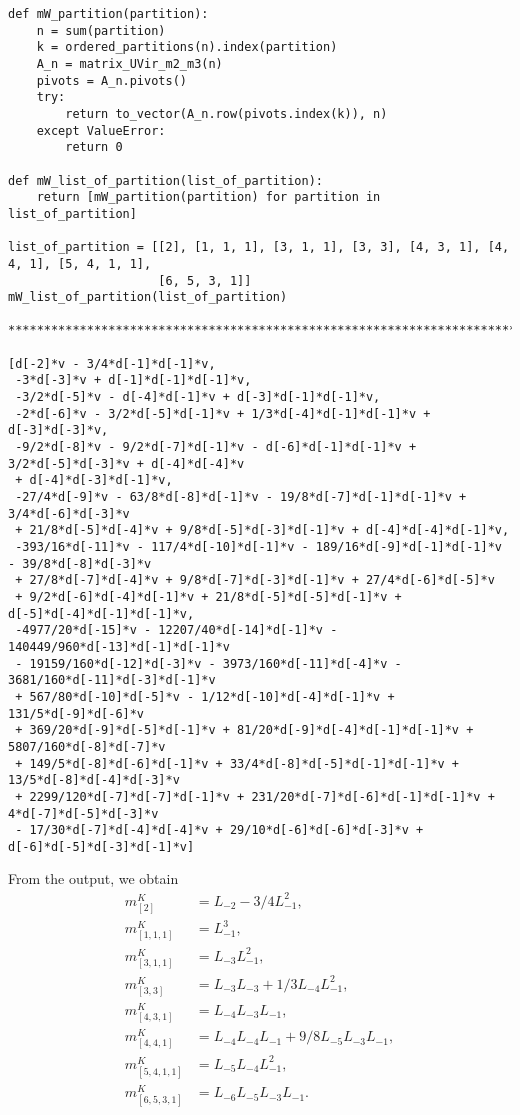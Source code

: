 \documentclass[12pt, a4paper]{article}
\begin{document}
\begin{footnotesize}
\begin{verbatim}
def mW_partition(partition):
    n = sum(partition)
    k = ordered_partitions(n).index(partition)
    A_n = matrix_UVir_m2_m3(n)
    pivots = A_n.pivots()
    try:
        return to_vector(A_n.row(pivots.index(k)), n)
    except ValueError:
        return 0

def mW_list_of_partition(list_of_partition):
    return [mW_partition(partition) for partition in list_of_partition]

list_of_partition = [[2], [1, 1, 1], [3, 1, 1], [3, 3], [4, 3, 1], [4, 4, 1], [5, 4, 1, 1],
                     [6, 5, 3, 1]]
mW_list_of_partition(list_of_partition)

*******************************************************************************************

[d[-2]*v - 3/4*d[-1]*d[-1]*v,
 -3*d[-3]*v + d[-1]*d[-1]*d[-1]*v,
 -3/2*d[-5]*v - d[-4]*d[-1]*v + d[-3]*d[-1]*d[-1]*v,
 -2*d[-6]*v - 3/2*d[-5]*d[-1]*v + 1/3*d[-4]*d[-1]*d[-1]*v + d[-3]*d[-3]*v,
 -9/2*d[-8]*v - 9/2*d[-7]*d[-1]*v - d[-6]*d[-1]*d[-1]*v + 3/2*d[-5]*d[-3]*v + d[-4]*d[-4]*v
 + d[-4]*d[-3]*d[-1]*v,
 -27/4*d[-9]*v - 63/8*d[-8]*d[-1]*v - 19/8*d[-7]*d[-1]*d[-1]*v + 3/4*d[-6]*d[-3]*v
 + 21/8*d[-5]*d[-4]*v + 9/8*d[-5]*d[-3]*d[-1]*v + d[-4]*d[-4]*d[-1]*v,
 -393/16*d[-11]*v - 117/4*d[-10]*d[-1]*v - 189/16*d[-9]*d[-1]*d[-1]*v - 39/8*d[-8]*d[-3]*v
 + 27/8*d[-7]*d[-4]*v + 9/8*d[-7]*d[-3]*d[-1]*v + 27/4*d[-6]*d[-5]*v
 + 9/2*d[-6]*d[-4]*d[-1]*v + 21/8*d[-5]*d[-5]*d[-1]*v + d[-5]*d[-4]*d[-1]*d[-1]*v,
 -4977/20*d[-15]*v - 12207/40*d[-14]*d[-1]*v - 140449/960*d[-13]*d[-1]*d[-1]*v
 - 19159/160*d[-12]*d[-3]*v - 3973/160*d[-11]*d[-4]*v - 3681/160*d[-11]*d[-3]*d[-1]*v
 + 567/80*d[-10]*d[-5]*v - 1/12*d[-10]*d[-4]*d[-1]*v + 131/5*d[-9]*d[-6]*v
 + 369/20*d[-9]*d[-5]*d[-1]*v + 81/20*d[-9]*d[-4]*d[-1]*d[-1]*v + 5807/160*d[-8]*d[-7]*v
 + 149/5*d[-8]*d[-6]*d[-1]*v + 33/4*d[-8]*d[-5]*d[-1]*d[-1]*v + 13/5*d[-8]*d[-4]*d[-3]*v
 + 2299/120*d[-7]*d[-7]*d[-1]*v + 231/20*d[-7]*d[-6]*d[-1]*d[-1]*v + 4*d[-7]*d[-5]*d[-3]*v
 - 17/30*d[-7]*d[-4]*d[-4]*v + 29/10*d[-6]*d[-6]*d[-3]*v + d[-6]*d[-5]*d[-3]*d[-1]*v]
\end{verbatim}
\end{footnotesize}

From the output, we obtain
\begin{align*}
  m^K_{[2]} &= L_{-2} - 3/4L_{-1}^2, \\
  m^K_{[1, 1, 1]} &= L_{-1}^3, \\
  m^K_{[3, 1, 1]} &= L_{-3}L_{-1}^2, \\
  m^K_{[3, 3]} &= L_{-3}L_{-3} + 1/3L_{-4}L_{-1}^2, \\
  m^K_{[4, 3, 1]} &= L_{-4}L_{-3}L_{-1}, \\
  m^K_{[4, 4, 1]} &= L_{-4}L_{-4}L_{-1} + 9/8L_{-5}L_{-3}L_{-1}, \\
  m^K_{[5, 4, 1, 1]} &= L_{-5}L_{-4}L_{-1}^2, \\
  m^K_{[6, 5, 3, 1]} &= L_{-6}L_{-5}L_{-3}L_{-1}.
\end{align*}



\end{document}
